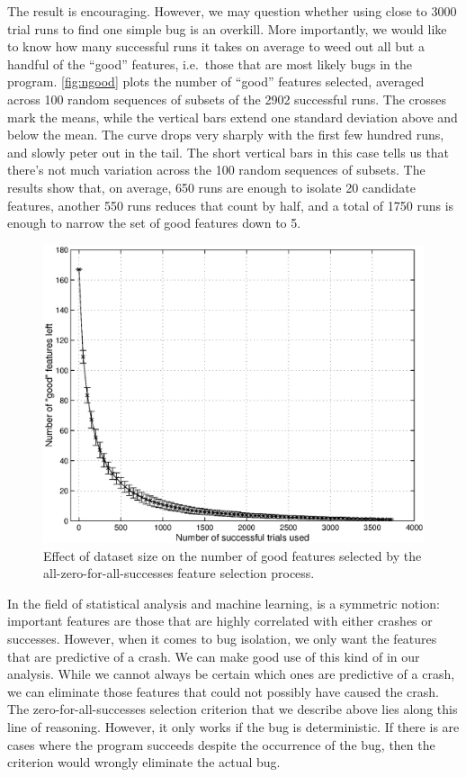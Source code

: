 The result is encouraging.  However, we may question whether using
close to 3000 trial runs to find one simple bug is an overkill.  More
importantly, we would like to know how many successful runs it takes
on average to weed out all but a handful of the ``good'' features,
i.e.\ those that are most likely bugs in the program.
\autoref{fig:ngood} plots the number of ``good'' features selected,
averaged across 100 random sequences of subsets of the 2902 successful
runs.  The crosses mark the means, while the vertical bars extend one
standard deviation above and below the mean.  The curve drops very
sharply with the first few hundred runs, and slowly peter out in the
tail.  The short vertical bars in this case tells us that there's not
much variation across the 100 random sequences of subsets.  The
results show that, on average, 650 runs are enough to isolate 20
candidate features, another 550 runs reduces that count by half, and a
total of 1750 runs is enough to narrow the set of good features down
to 5.

\begin{figure}
  \centering
  \small
  \includegraphics[width=\columnwidth]{applications/ds1000ngood_plot}
  \caption{Effect of dataset size on the number of good features
    selected by the all-zero-for-all-successes feature selection
    process.}
  \label{fig:ngood}
\end{figure}

In the field of statistical analysis and machine learning,
 is a symmetric notion: important features
are those that are highly correlated with either crashes or successes.
However, when it comes to bug isolation, we only want the features
that are predictive of a crash.  We can make good use of this kind of
 in our analysis.  While we cannot
always be certain which ones are predictive of a crash, we can
eliminate those features that could not possibly have caused the
crash.  The zero-for-all-successes selection criterion that we
describe above lies along this line of reasoning.  However, it only
works if the bug is deterministic.  If there is are cases where
the program succeeds despite the occurrence of the bug, then the
criterion would wrongly eliminate the actual bug.

